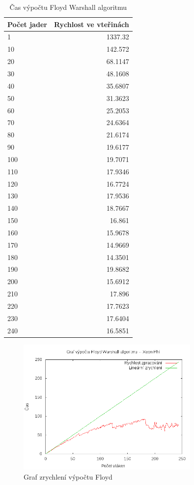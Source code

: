 \documentclass[a4paper,10pt]{article}
\begin{document}
\begin{table}[H]
  \centering
	\caption{Čas výpočtu Floyd Warshall algoritmu}
	\begin{tabular}{| l | r |}
\hline
Počet jader & Rychlost ve vteřinách \\ \hline
1 & 1337.32 \\ \hline
10 & 142.572 \\ \hline
20 & 68.1147 \\ \hline
30 & 48.1608 \\ \hline
40 & 35.6807 \\ \hline
50 & 31.3623 \\ \hline
60 & 25.2053 \\ \hline
70 & 24.6364 \\ \hline
80 & 21.6174 \\ \hline
90 & 19.6177 \\ \hline
100 & 19.7071 \\ \hline
110 & 17.9346 \\ \hline
120 & 16.7724 \\ \hline
130 & 17.9536 \\ \hline
140 & 18.7667 \\ \hline
150 & 16.861 \\ \hline
160 & 15.9678 \\ \hline
170 & 14.9669 \\ \hline
180 & 14.3501 \\ \hline
190 & 19.8682 \\ \hline
200 & 15.6912 \\ \hline
210 & 17.896 \\ \hline
220 & 17.7623 \\ \hline
230 & 17.6404 \\ \hline
240 & 16.5851 \\ \hline
	\end{tabular}
  \label{tab:djph}
\end{table}

\begin{figure}[H]
  \centering
    \includegraphics[width=0.8\textwidth]{graf_floyd_phi.png}
  \caption{Graf zrychlení výpočtu Floyd}
  \label{fig:floydphi}
\end{figure}
\end{document}
